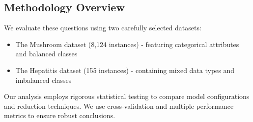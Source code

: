 \subsection{Methodology Overview}

We evaluate these questions using two carefully selected datasets:
\begin{itemize}
    \item The Mushroom dataset (8,124 instances) - featuring categorical attributes and balanced classes
    \item The Hepatitis dataset (155 instances) - containing mixed data types and imbalanced classes
\end{itemize}

Our analysis employs rigorous statistical testing to compare model configurations and reduction techniques. We use cross-validation and multiple performance metrics to ensure robust conclusions.
